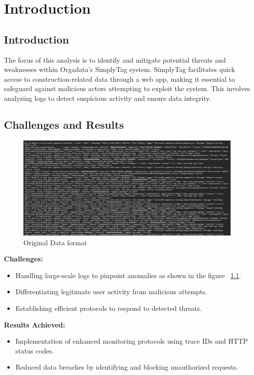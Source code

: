 %
%

\chapter{Introduction}

\section{Introduction}

The focus of this analysis is to identify and mitigate potential threats and weaknesses within Orgadata’s SimplyTag system. SimplyTag facilitates quick access to construction-related data through a web app, making it essential to safeguard against malicious actors attempting to exploit the system. This involves analyzing logs to detect suspicious activity and ensure data integrity.

\section{Challenges and Results}

\begin{figure}
	\begin{center}
		\includegraphics[width=0.7\linewidth]{Images/Data_Img.png}
		\caption{Original Data format}
		\label{Data_Img} 
	\end{center}
\end{figure}

\textbf{Challenges:}
\begin{itemize}
	\item Handling large-scale logs to pinpoint anomalies as shown in the figure ~\ref{Data_Img}.
	\item Differentiating legitimate user activity from malicious attempts.
	\item Establishing efficient protocols to respond to detected threats.
\end{itemize}

\textbf{Results Achieved:}
\begin{itemize}
	\item Implementation of enhanced monitoring protocols using trace IDs and HTTP status codes.
	\item Reduced data breaches by identifying and blocking unauthorized requests.
\end{itemize}



